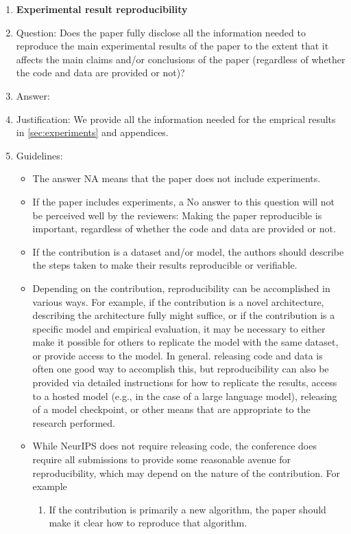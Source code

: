 \documentclass{article}
\begin{document}
\begin{enumerate}
    \item {\bf Experimental result reproducibility}
    \item[] Question: Does the paper fully disclose all the information needed to reproduce the main experimental results of the paper to the extent that it affects the main claims and/or conclusions of the paper (regardless of whether the code and data are provided or not)?
    \item[] Answer: \answerYes{} %
    \item[] Justification: We provide all the information needed for the emprical results in \cref{sec:experiments} and appendices.
    \item[] Guidelines:
    \begin{itemize}
        \item The answer NA means that the paper does not include experiments.
        \item If the paper includes experiments, a No answer to this question will not be perceived well by the reviewers: Making the paper reproducible is important, regardless of whether the code and data are provided or not.
        \item If the contribution is a dataset and/or model, the authors should describe the steps taken to make their results reproducible or verifiable. 
        \item Depending on the contribution, reproducibility can be accomplished in various ways. For example, if the contribution is a novel architecture, describing the architecture fully might suffice, or if the contribution is a specific model and empirical evaluation, it may be necessary to either make it possible for others to replicate the model with the same dataset, or provide access to the model. In general. releasing code and data is often one good way to accomplish this, but reproducibility can also be provided via detailed instructions for how to replicate the results, access to a hosted model (e.g., in the case of a large language model), releasing of a model checkpoint, or other means that are appropriate to the research performed.
        \item While NeurIPS does not require releasing code, the conference does require all submissions to provide some reasonable avenue for reproducibility, which may depend on the nature of the contribution. For example
        \begin{enumerate}
            \item If the contribution is primarily a new algorithm, the paper should make it clear how to reproduce that algorithm.

\end{enumerate}
\end{itemize}
\end{enumerate}
\end{document}
